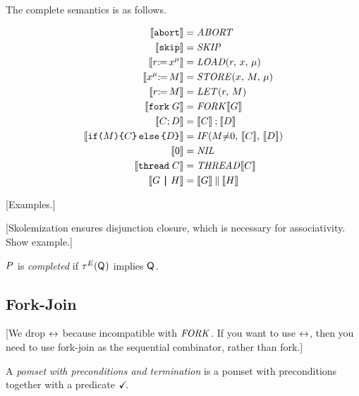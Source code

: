 The complete semantics is as follows.
\begin{scope}
  \allowdisplaybreaks
  \begin{align*}
    \sem{\ABORT} &= \sABORT
    \\
    \sem{\SKIP} &= \sSKIP
    \\
    \sem{\PR[\amode]{\aLoc}{\aReg}} &= \sLOAD[\amode]{\aReg}{\aLoc}
    \\
    \sem{\PW[\amode]{\aLoc}{\aExp}} &= \sSTORE[\amode]{\aLoc}{\aExp}
    \\
    \sem{\LET{\aReg}{\aExp}} &= \sLET{\aReg}{\aExp}
    \\
    \sem{\FORK{\aGrp}} &= \sFORK{}\sem{\aGrp}
    \\
    \sem{\aCmd \SEMI \bCmd} &= \sem{\aCmd}\sSEMI\sem{\bCmd}
    \\
    \sem{\IF{\aExp}\THEN\aCmd\ELSE\bCmd\FI} &= \sIF{\aExp{\neq}0}\sTHEN\sem{\aCmd}\sELSE\sem{\bCmd}\sFI
    \\
    \sem{\NIL} &= \sNIL
    \\
    \sem{\THREAD{\aCmd}} &= \sTHREAD{}\sem{\aCmd}
    \\
    \sem{\aGrp \PAR \bGrp} &= \sem{\aGrp}\sPAR\sem{\bGrp}
  \end{align*}
\end{scope}
[Examples.]








[Skolemization ensures disjunction closure, which is necessary
for associativity. Show example.]

\begin{definition}
  $\aPS$ is \emph{completed} if $\aTr[\aEvs](\Q{})$ implies $\Q{}$.
\end{definition}

\subsection{Fork-Join}

[We drop $\reorder$ because incompatible with $\sFORK{}$.  If you want to use
$\reorder$, then you need to use fork-join as the sequential combinator,
rather than fork.]

\begin{definition}
  A \emph{pomset with preconditions and termination} is
  a pomset with preconditions together with a predicate $\TICK$.
\end{definition}


